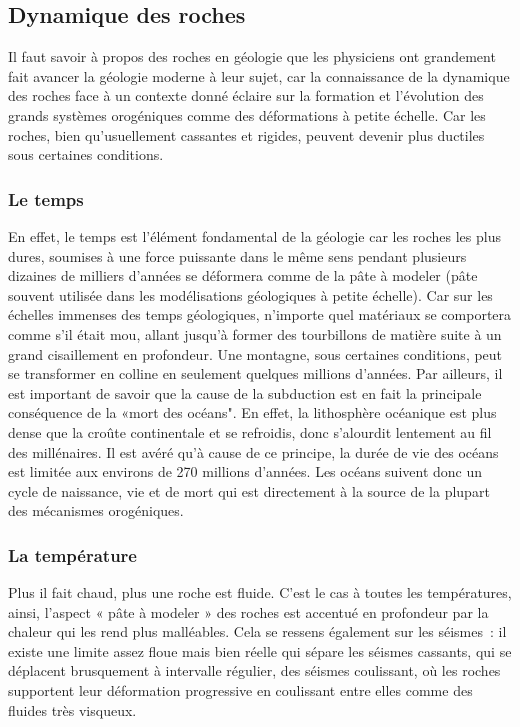 \documentclass[a4paper,11pt]{article}
\begin{document}
\subsection{Dynamique des roches}
	
Il faut savoir à propos des roches en géologie que les physiciens ont grandement fait avancer la géologie moderne à leur sujet, car la connaissance de la dynamique des roches face à un contexte donné éclaire sur la formation et l'évolution des grands systèmes orogéniques comme des déformations à petite échelle.
Car les roches, bien qu'usuellement cassantes et rigides, peuvent devenir plus ductiles sous certaines conditions. \\

\subsubsection{Le temps}

En effet, le temps est l'élément fondamental de la géologie car les roches les plus dures, soumises à une force puissante dans le même sens pendant plusieurs dizaines de milliers d'années se déformera comme de la pâte à modeler (pâte souvent utilisée dans les modélisations géologiques à petite échelle).
Car sur les échelles immenses des temps géologiques, n'importe quel matériaux se comportera comme s'il était mou, allant jusqu'à former des tourbillons de matière suite à un grand cisaillement en profondeur.
Une montagne, sous certaines conditions, peut se transformer en colline en seulement quelques millions d'années.
Par ailleurs, il est important de savoir que la cause de la subduction est en fait la principale conséquence de la «mort des océans".
En effet, la lithosphère océanique est plus dense que la croûte continentale et se refroidis, donc s'alourdit lentement au fil des millénaires.
Il est avéré qu'à cause de ce principe, la durée de vie des océans est limitée aux environs de 270 millions d'années.
Les océans suivent donc un cycle de naissance, vie et de mort qui est directement à la source de la plupart des mécanismes orogéniques. 

\subsubsection{La température}

Plus il fait chaud, plus une roche est fluide.
C'est le cas à toutes les températures, ainsi, l'aspect « pâte à modeler » des roches est accentué en profondeur par la chaleur qui les rend plus malléables.
Cela se ressens également sur les séismes~: il existe une limite assez floue mais bien réelle qui sépare les séismes cassants, qui se déplacent brusquement à intervalle régulier, des séismes coulissant, où les roches supportent leur déformation progressive en coulissant entre elles comme des fluides très visqueux.
\end{document}

